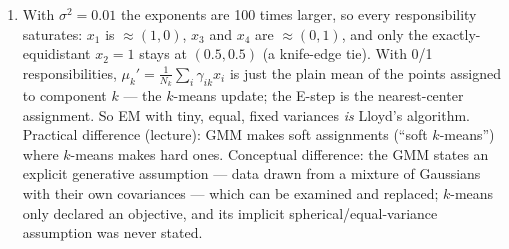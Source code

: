 \documentclass[
  11pt,
]{article}
\begin{document}
\begin{solutionbox}
\begin{enumerate}
  complete-data objective (plus a term that does not depend on
  \(\theta\)) is a lower bound on \(\ell(\theta)\) that \emph{touches}
  \(\ell\) at the current \(\theta\); the M-step raises the bound, and
  \(\ell\) sits above the raised bound, so
  \(\ell(\theta^{\rm new}) \ge \ell(\theta^{\rm old})\) (the lecture
  asserts the monotone increase; the ``touching lower bound'' sentence
  is the reason). Guarantee: \(\ell^{(t)}\) is non-decreasing and
  bounded above, so it converges --- which is what the
  log-likelihood-change stopping rule relies on. Not guaranteed: that
  the limit is the global maximum; EM finds a \emph{local} maximum and
  depends on the initialization --- exactly like the \(k\)-means run in
  HW3 Problem 1(c) that stopped at WCSS 74 instead of 33.5. In practice:
  initialize from \(k\)-means and/or run several restarts, keep the
  highest \(\ell\).
\item
  With \(\sigma^2 = 0.01\) the exponents are 100 times larger, so every
  responsibility saturates: \(x_1\) is \(\approx(1,0)\), \(x_3\) and
  \(x_4\) are \(\approx(0,1)\), and only the exactly-equidistant
  \(x_2 = 1\) stays at \((0.5, 0.5)\) (a knife-edge tie). With 0/1
  responsibilities, \(\mu_k' = \frac{1}{N_k}\sum_i\gamma_{ik}x_i\) is
  just the plain mean of the points assigned to component \(k\) --- the
  \(k\)-means update; the E-step is the nearest-center assignment. So EM
  with tiny, equal, fixed variances \emph{is} Lloyd's algorithm.
  Practical difference (lecture): GMM makes soft assignments (``soft
  \(k\)-means'') where \(k\)-means makes hard ones. Conceptual
  difference: the GMM states an explicit generative assumption --- data
  drawn from a mixture of Gaussians with their own covariances --- which
  can be examined and replaced; \(k\)-means only declared an objective,
  and its implicit spherical/equal-variance assumption was never stated.
\end{enumerate}

\end{solutionbox}
\end{document}
